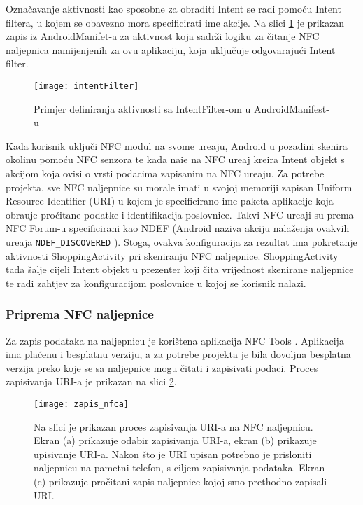 Ozna\v{c}avanje aktivnosti kao sposobne za obraditi Intent se radi pomo\'{c}u Intent filtera, u kojem se obavezno mora specificirati ime akcije. Na slici \ref{fig:intentFilter} je prikazan zapis iz AndroidManifet-a za aktivnost koja sadr\v{z}i logiku za \v{c}itanje NFC naljepnica namijenjenih za ovu aplikaciju, koja uklju\v{c}uje odgovaraju\'{c}i Intent filter.

\begin{figure}[!htbp]
	\begin{center}
 \texttt{[image: intentFilter]}
 \caption{Primjer definiranja aktivnosti sa IntentFilter-om u AndroidManifest-u}
 \label{fig:intentFilter}
	\end{center}
\end{figure}

Kada korisnik uklju\v{c}i NFC modul na svome ure\dj aju, Android u pozadini skenira okolinu pomo\'{c}u NFC senzora te kada nai\dj e na NFC ure\dj aj kreira Intent objekt s akcijom koja ovisi o vrsti podacima zapisanim na NFC ure\dj aju. Za potrebe projekta, sve NFC naljepnice su morale imati u svojoj memoriji zapisan Uniform Resource Identifier (URI) u kojem je specificirano ime paketa aplikacije koja obra\dj uje pro\v{c}itane podatke i identifikacija poslovnice. Takvi NFC ure\dj aji su prema NFC Forum-u specificirani kao NDEF \cite{NdefMessage} (Android naziva akciju nala\v{z}enja ovakvih ure\dj aja \verb|NDEF_DISCOVERED| \cite{ndef_discovered}).
Stoga, ovakva konfiguracija za rezultat ima pokretanje aktivnosti ShoppingActivity pri skeniranju NFC naljepnice. ShoppingActivity tada \v{s}alje cijeli Intent objekt u prezenter koji \v{c}ita vrijednost skenirane naljepnice te radi zahtjev za konfiguracijom poslovnice u kojoj se korisnik nalazi.

\subsubsection{Priprema NFC naljepnice}
Za zapis podataka na naljepnicu je kori\v{s}tena aplikacija NFC Tools \cite{nfcTools}. Aplikacija ima pla\'{c}enu i besplatnu verziju, a za potrebe projekta je bila dovoljna besplatna verzija preko koje se sa naljepnice mogu \v{c}itati i zapisivati podaci. Proces zapisivanja URI-a je prikazan na slici \ref{fig:zapisNfca}.


\begin{figure}[!htbp]
	\begin{center}
 \texttt{[image: zapis\_nfca]}
 \caption{Na slici je prikazan proces zapisivanja URI-a na NFC naljepnicu. Ekran (a) prikazuje odabir zapisivanja URI-a, ekran (b) prikazuje upisivanje URI-a. Nakon \v{s}to je URI upisan potrebno je prisloniti naljepnicu na pametni telefon, s ciljem zapisivanja podataka. Ekran (c) prikazuje pro\v{c}itani zapis naljepnice kojoj smo prethodno zapisali URI.}
 \label{fig:zapisNfca}
	\end{center}
\end{figure}

